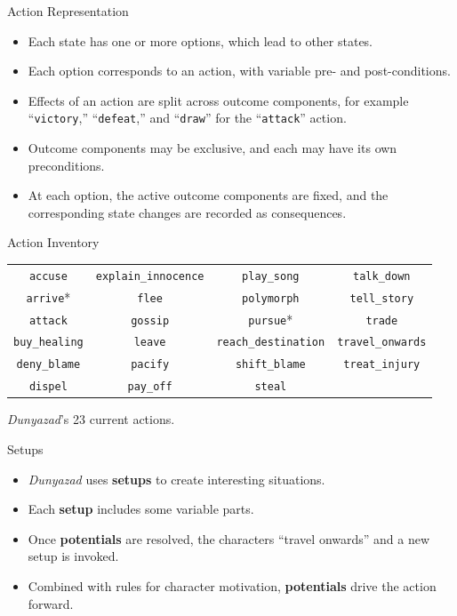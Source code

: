 \documentclass[xcolor=x11names]{beamer}
\newcommand{\cg}[1]{{\leavevmode\color{gray} #1}}
\newcommand{\pr}[1]{\texttt{#1}}
\newcommand{\prq}[2]{``\texttt{#1}{#2}''}
\def\dunyazad/{\textit{Dunyazad}}
\begin{document}
\begin{frame}{Action Representation}
  \begin{itemize}\addtolength{\itemsep}{0.5\baselineskip}
    \item Each state has one or more options, which lead to other states.
    \item Each option corresponds to an action, with variable pre- and post-conditions.
    \item Effects of an action are split across outcome components, for example \prq{victory}{,} \prq{defeat}{,} and \prq{draw}{} for the \prq{attack}{} action.
    \item Outcome components may be exclusive, and each may have its own preconditions.
    \item At each option, the active outcome components are fixed, and the corresponding state changes are recorded as consequences.
  \end{itemize}
\end{frame}

\begin{frame}{Action Inventory}
\vfill
\centering
\renewcommand*{\arraystretch}{1.5}
\footnotesize
\hspace*{-1.5em}
\begin{tabular}{c c c c}
  \pr{accuse}       & \pr{explain\_innocence} & \pr{play\_song}         & \pr{talk\_down} \\
  \cg{\pr{arrive}*}       & \pr{flee}               & \pr{polymorph}          & \pr{tell\_story} \\
  \pr{attack}       & \pr{gossip}             & \cg{\pr{pursue}*}             & \pr{trade} \\
  \pr{buy\_healing} & \pr{leave}              & \pr{reach\_destination} & \pr{travel\_onwards} \\
  \pr{deny\_blame}  & \pr{pacify}             & \pr{shift\_blame}       & \pr{treat\_injury} \\
  \pr{dispel}       & \pr{pay\_off}           & \pr{steal}
\end{tabular}
\vfill
\normalsize
\dunyazad/'s 23 current actions.
\end{frame}

\begin{frame}{Setups}
  \begin{itemize}\addtolength{\itemsep}{0.5\baselineskip}
    \item \dunyazad/ uses \textbf{setups} to create interesting situations.
    \item Each \textbf{setup} includes some variable parts.
    \item Once \textbf{potentials} are resolved, the characters ``travel onwards'' and a new setup is invoked.
    \item Combined with rules for character motivation, \textbf{potentials} drive the action forward.
  \end{itemize}
\end{frame}
\end{document}
